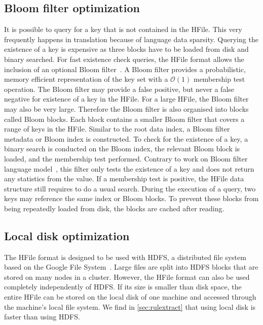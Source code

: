 \subsection{Bloom filter optimization}

It is possible to query for a key that is not contained in the HFile. This very
frequently happens in translation because of language data sparsity. Querying
the existence of a key is expensive as three blocks have to be loaded from disk
and binary searched. For fast existence check queries, the HFile format allows
the inclusion of an optional Bloom filter~\citep{bloom:1970:ACM}. A Bloom filter
provides a probabilistic, memory efficient representation of the key set with a
$\mathcal{O}(1)$ membership test operation. The Bloom filter may provide a false
positive,
but never a false negative for existence of a key in the HFile. For a large
HFile, the Bloom filter may also be very large. Therefore the  Bloom filter is
also organised into blocks called Bloom blocks. Each block contains a smaller
Bloom filter that covers a range of keys in the HFile. Similar to the root data
index, a Bloom filter metadata or Bloom index is constructed. To check for the
existence of a key, a binary search is conducted on the Bloom index, the
relevant Bloom block is loaded, and the membership test performed. Contrary to
work on Bloom filter language
model~\citep{talbot-osborne:2007:ACL,talbot-osborne:2007:EMNLP-CoNLL}, this
filter only tests the existence of a key and does not return any statistics from
the value. If a membership test is positive, the HFile data structure still
requires to do a usual search. During the execution of a query, two keys may
reference the same index or Bloom blocks. To prevent these blocks from being
repeatedly loaded from disk, the blocks are cached after reading.

\subsection{Local disk optimization}

The HFile format is designed to be used with HDFS, a distributed file system
based on the Google File System~\citep{ghemawat-gobioff-leung:2003:OSP}. Large
files are split into HDFS blocks that are stored on many nodes in a cluster.
However, the HFile format can also be used completely independently of HDFS. If
its size is smaller than disk space, the entire HFile can be stored on the local
disk of one machine and accessed through the machine's local file system. We
find in \autoref{sec:rulextract} that using local disk
is faster than using HDFS.

